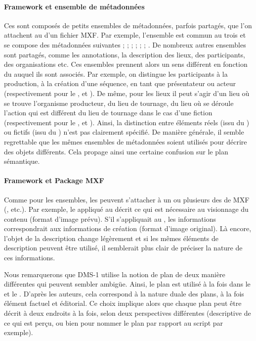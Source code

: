 \paragraph{Framework et ensemble de métadonnées}
Ces  sont composés de petits ensembles de métadonnées, parfois partagés,  que l'on attachent au  d'un fichier MXF. 
Par exemple, l'ensemble  est commun au trois  et se compose des métadonnées suivantes ;  ;  ;  ;  ;  ; . 
De nombreux autres ensembles sont partagés, comme les annotations, la description des lieux, des participants, des organisations etc. 
Ces ensembles prennent alors un sens différent en fonction du  auquel ils sont associés. 
Par exemple, on distingue les participants à la production, à la création d'une séquence, en tant que présentateur ou acteur (respectivement pour le ,  et ). 
De même, pour les lieux il peut s'agir d'un lieu où se trouve l'organisme producteur, du lieu de tournage, du lieu où se déroule l'action qui est différent du lieu de tournage dans le cas d'une fiction (respectivement pour le ,  et ). 
Ainsi, la distinction entre éléments réels (issu du ) ou fictifs (issu du ) n'est pas clairement spécifié. 
De manière générale, il semble regrettable que les mêmes ensembles de métadonnées soient utilisés pour décrire des objets différents.
Cela propage ainsi une certaine confusion sur le plan sémantique. 

\paragraph{Framework et Package MXF}
Comme pour les ensembles, les  peuvent s'attacher à un ou plusieurs des  de MXF (,  etc.). 
Par exemple, le  appliqué au  décrit ce qui est nécessaire au visionnage du contenu (format d'image prévu).
S'il s'appliquait au , les informations correspondrait aux informations de création (format d'image original).
Là encore, l'objet de la description change légèrement et si les mêmes éléments de description peuvent être utilisé, il semblerait plus clair de préciser la nature de ces informations. 

Nous remarquerons que DMS-1 utilise la notion de plan de deux manière différentes qui peuvent sembler ambigüe. 
Ainsi, le plan est utilisé à la fois dans le  et le . 
D'après les auteurs, cela correspond à la nature duale des plans, à la fois élément factuel et éditorial. 
Ce choix implique alors que chaque plan peut être décrit à deux endroits à la fois, selon deux perspectives différentes (descriptive de ce qui est perçu, ou bien pour nommer le plan par rapport au script par exemple).

